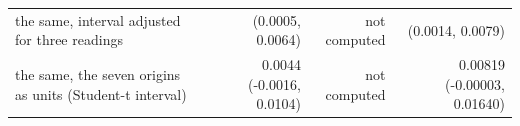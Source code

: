 \begin{tabular}{lrrr}
the same, interval adjusted for three readings & (0.0005, 0.0064) & not computed & (0.0014, 0.0079) \\
the same, the seven origins as units (Student-t interval) & 0.0044 (-0.0016, 0.0104) & not computed & 0.00819 (-0.00003, 0.01640) \\
\bottomrule
\end{tabular}
